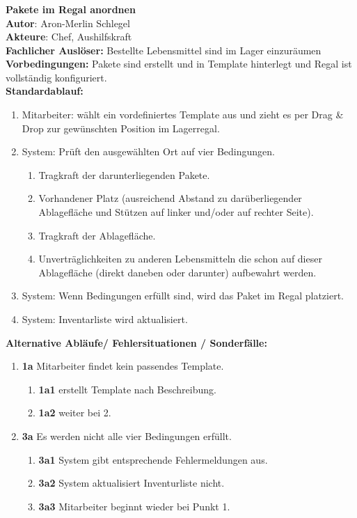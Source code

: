 \subsubsection*{}
\textbf{Pakete im Regal anordnen}\bigskip\\
\textbf{Autor}: Aron-Merlin Schlegel\\
\textbf{Akteure}: Chef, Aushilfskraft\\
\textbf{Fachlicher Auslöser:} Bestellte Lebensmittel sind im Lager einzuräumen \\
\textbf{Vorbedingungen: }Pakete sind erstellt und in Template hinterlegt und Regal ist vollständig konfiguriert.\\
\textbf{Standardablauf:} 
\begin{enumerate}
    \item Mitarbeiter: wählt ein vordefiniertes Template aus und zieht es per Drag \& Drop zur gewünschten Position im Lagerregal.
    \item System: Prüft den ausgewählten Ort auf vier Bedingungen.
    \begin{enumerate}
        \item Tragkraft der darunterliegenden Pakete.
        \item Vorhandener Platz (ausreichend Abstand zu darüberliegender Ablagefläche und Stützen auf linker und/oder auf rechter Seite).
        \item Tragkraft der Ablagefläche.
        \item Unverträglichkeiten zu anderen Lebensmitteln die schon auf dieser Ablagefläche (direkt daneben oder darunter) aufbewahrt werden.
    \end{enumerate}
    \item System: Wenn Bedingungen erfüllt sind, wird das Paket im Regal platziert.
    \item System: Inventarliste wird aktualisiert.
\end{enumerate}
\textbf{Alternative Abläufe/ Fehlersituationen / Sonderfälle:}
\begin{enumerate}
    \item[] \textbf{1a} Mitarbeiter findet kein passendes Template.
    \begin{enumerate}
        \item[] \textbf{1a1} erstellt Template nach Beschreibung.
        \item[] \textbf{1a2} weiter bei 2.
    \end{enumerate}
    \item[] \textbf{3a} Es werden nicht alle vier Bedingungen erfüllt.
    \begin{enumerate}
        \item[] \textbf{3a1} System gibt entsprechende Fehlermeldungen aus.
        \item[] \textbf{3a2} System aktualisiert Inventurliste nicht.
        \item[] \textbf{3a3} Mitarbeiter beginnt wieder bei Punkt 1.
    \end{enumerate}
\end{enumerate}
